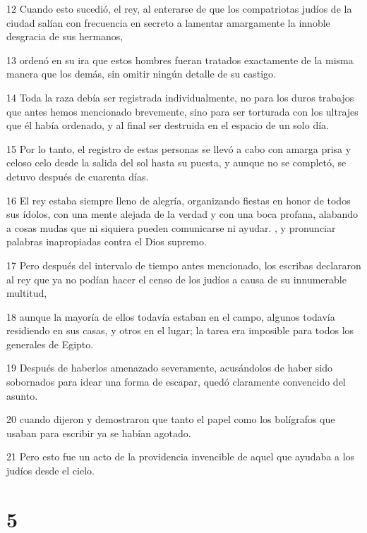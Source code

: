 \par 12 Cuando esto sucedió, el rey, al enterarse de que los compatriotas judíos de la ciudad salían con frecuencia en secreto a lamentar amargamente la innoble desgracia de sus hermanos,
\par 13 ordenó en su ira que estos hombres fueran tratados exactamente de la misma manera que los demás, sin omitir ningún detalle de su castigo.
\par 14 Toda la raza debía ser registrada individualmente, no para los duros trabajos que antes hemos mencionado brevemente, sino para ser torturada con los ultrajes que él había ordenado, y al final ser destruida en el espacio de un solo día.
\par 15 Por lo tanto, el registro de estas personas se llevó a cabo con amarga prisa y celoso celo desde la salida del sol hasta su puesta, y aunque no se completó, se detuvo después de cuarenta días.
\par 16 El rey estaba siempre lleno de alegría, organizando fiestas en honor de todos sus ídolos, con una mente alejada de la verdad y con una boca profana, alabando a cosas mudas que ni siquiera pueden comunicarse ni ayudar. , y pronunciar palabras inapropiadas contra el Dios supremo.
\par 17 Pero después del intervalo de tiempo antes mencionado, los escribas declararon al rey que ya no podían hacer el censo de los judíos a causa de su innumerable multitud,
\par 18 aunque la mayoría de ellos todavía estaban en el campo, algunos todavía residiendo en sus casas, y otros en el lugar; la tarea era imposible para todos los generales de Egipto.
\par 19 Después de haberlos amenazado severamente, acusándolos de haber sido sobornados para idear una forma de escapar, quedó claramente convencido del asunto.
\par 20 cuando dijeron y demostraron que tanto el papel como los bolígrafos que usaban para escribir ya se habían agotado.
\par 21 Pero esto fue un acto de la providencia invencible de aquel que ayudaba a los judíos desde el cielo.

\chapter{5}


